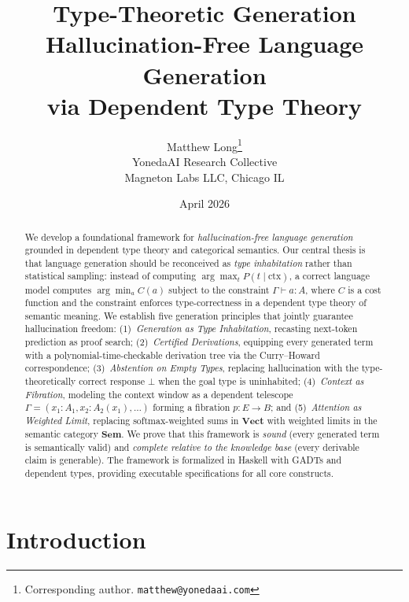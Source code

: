 \documentclass[11pt,a4paper]{article}
\title{%
  \textbf{Type-Theoretic Generation}\\[6pt]
  \large Hallucination-Free Language Generation\\
  via Dependent Type Theory%
}
\author{%
  Matthew Long\thanks{%
    Corresponding author. \texttt{matthew@yonedaai.com}%
  }\\[2pt]
  \small YonedaAI Research Collective\\
  \small Magneton Labs LLC, Chicago IL%
}
\date{April 2026}
\theoremstyle{plain}
\theoremstyle{definition}
\theoremstyle{remark}
\newcommand{\Sem}{\mathbf{Sem}}
\newcommand{\Vect}{\mathbf{Vect}}
\begin{document}
\maketitle

\begin{abstract}
We develop a foundational framework for \emph{hallucination-free language generation} grounded in dependent type theory and categorical semantics.
Our central thesis is that language generation should be reconceived as \emph{type inhabitation} rather than statistical sampling: instead of computing $\arg\max_t P(t \mid \mathrm{ctx})$, a correct language model computes $\arg\min_a C(a)$ subject to the constraint $\Gamma \vdash a : A$, where $C$ is a cost function and the constraint enforces type-correctness in a dependent type theory of semantic meaning.
We establish five generation principles that jointly guarantee hallucination freedom: (1)~\emph{Generation as Type Inhabitation}, recasting next-token prediction as proof search; (2)~\emph{Certified Derivations}, equipping every generated term with a polynomial-time-checkable derivation tree via the Curry--Howard correspondence; (3)~\emph{Abstention on Empty Types}, replacing hallucination with the type-theoretically correct response $\bot$ when the goal type is uninhabited; (4)~\emph{Context as Fibration}, modeling the context window as a dependent telescope $\Gamma = (x_1 : A_1, x_2 : A_2(x_1), \ldots)$ forming a fibration $p : E \to B$; and (5)~\emph{Attention as Weighted Limit}, replacing softmax-weighted sums in $\Vect$ with weighted limits in the semantic category $\Sem$.
We prove that this framework is \emph{sound} (every generated term is semantically valid) and \emph{complete relative to the knowledge base} (every derivable claim is generable).
The framework is formalized in Haskell with GADTs and dependent types, providing executable specifications for all core constructs.
\end{abstract}

\tableofcontents
\newpage

\section{Introduction}\label{sec:intro}
\end{document}
